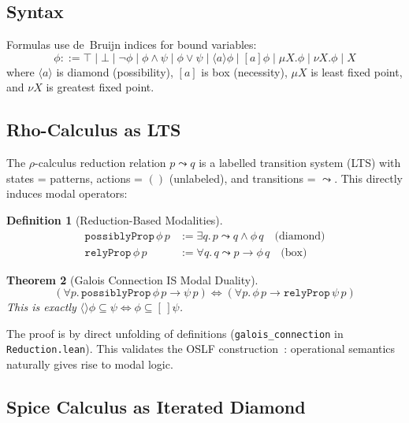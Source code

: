 \documentclass[11pt]{article}
\newtheorem{theorem}{Theorem}[section]
\theoremstyle{definition}
\newtheorem{definition}[theorem]{Definition}
\theoremstyle{remark}
\begin{document}
\subsection{Syntax}

Formulas use de~Bruijn indices for bound variables:
\[
  \phi ::= \top \mid \bot \mid \neg \phi \mid \phi \land \psi \mid
           \phi \lor \psi \mid \langle a \rangle \phi \mid [a] \phi
           \mid \mu X.\phi \mid \nu X.\phi \mid X
\]
where $\langle a \rangle$ is diamond (possibility), $[a]$ is box
(necessity), $\mu X$ is least fixed point, and $\nu X$ is greatest
fixed point.

\subsection{Rho-Calculus as LTS}

The $\rho$-calculus reduction relation $p \leadsto q$ is a labelled
transition system (LTS) with
states = patterns, actions = $()$ (unlabeled), and transitions =
$\leadsto$.  This directly induces modal operators:

\begin{definition}[Reduction-Based Modalities]
\begin{align*}
\texttt{possiblyProp}\, \phi\, p &:= \exists q.\, p \leadsto q \land \phi\, q \quad \text{(diamond)} \\
\texttt{relyProp}\, \phi\, p &:= \forall q.\, q \leadsto p \to \phi\, q \quad \text{(box)}
\end{align*}
\end{definition}

\begin{theorem}[Galois Connection IS Modal Duality]
\label{thm:galois}
\[
(\forall p.\, \texttt{possiblyProp}\, \phi\, p \to \psi\, p) \iff
(\forall p.\, \phi\, p \to \texttt{relyProp}\, \psi\, p)
\]
This is exactly $\langle\rangle \phi \subseteq \psi \iff
\phi \subseteq [\,] \psi$.
\end{theorem}

\noindent
The proof is by direct unfolding of definitions
(\texttt{galois\_connection} in \texttt{Reduction.lean}).
This validates the OSLF construction~\cite{MeredithStayOSLF2020,leanOSLF2025}:
operational semantics naturally gives rise to modal logic.

\subsection{Spice Calculus as Iterated Diamond}
\end{document}
